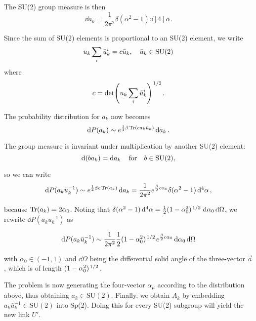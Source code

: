 \documentclass[reqno,12pt]{article}
\numberwithin{equation}{section}
\newcommand{\SU}{\mathrm{SU}}
\begin{document}
The SU(2) group measure is then
\begin{equation}
	\dd{a_k} = \frac{1}{2\pi^2} \delta(\alpha^2 - 1) \dd[4]{\alpha}.
\end{equation}

Since the sum of SU(2) elements is proportional to an SU(2) element, we write
\begin{equation}
	u_k \sum_i \tilde{u}_k^i = c \bar{u}_k \qc \bar{u}_k \in \SU(2)
\end{equation}
where 
\begin{equation}
	c = \det(u_k \sum_i \tilde{u}_k^i)^{\flatfrac{1}{2}}.
\end{equation}

The probability distribution for $a_k$ now becomes
\begin{equation}
	\dd{P(a_k)} \sim e^{\frac{1}{4}\beta\Tr(c a_k \bar{u}_k)} \dd{a_k}.
\end{equation}

The group measure is invariant under multiplication by another SU(2) element:
\begin{equation}
	\dd(b a_k) = \dd{a_k} \qfor b \in \SU(2),
\end{equation}

so we can write
\begin{equation}
	\dd{P(a_k \bar{u}_k^{-1})} \sim e^{\frac{1}{4}\beta c \Tr(a_k)} \dd{a_k} 
	= \frac{1}{2\pi^2} e^{\frac{\beta}{2}c \alpha_0} \delta(\alpha^2 - 1) \dd[4]{\alpha},
\end{equation}

because $\Tr(a_k) = 2\alpha_0$. Noting that $\delta(\alpha^2 - 1)\dd[4]{\alpha} = 
\frac{1}{2}(1 - \alpha_0^2)^{\flatfrac{1}{2}} \dd{\alpha_0}\dd{\Omega}$, we rewrite $\dd{P(a_k \bar{u}_k^{-1})}$ as

\begin{equation}
	\dd{P(a_k \bar{u}_k^{-1})} \sim 
	\frac{1}{2\pi^2} \frac{1}{2}(1 - \alpha_0^2)^{\flatfrac{1}{2}} e^{\frac{\beta}{2}c \alpha_0} \dd{\alpha_0}\dd{\Omega}
\end{equation}

with $\alpha_0 \in (-1,1)$ and $\dd{\Omega}$ being the differential solid angle of the three-vector $\vec{a}$,
which is of length $(1 - \alpha_0^2)^{\flatfrac{1}{2}}$.

The problem is now generating the four-vector $\alpha_\mu$ according to the distribution above, thus obtaining
$a_k \in \SU(2)$. Finally, we obtain $A_k$ by embedding $a_k \bar{u}_k^{-1} \in \SU(2)$ into Sp(2). Doing this for every 
SU(2) subgroup will yield the new link $U'$.
\end{document}

